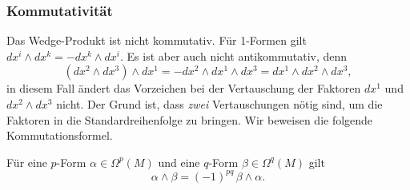 %
%
\subsubsection{Kommutativität}
Das Wedge-Produkt ist nicht kommutativ.
Für 1-Formen gilt $dx^i\wedge dx^k=-dx^k\wedge dx^i$.
Es ist aber auch nicht antikommutativ, denn 
\[
(dx^2\wedge dx^3)\wedge dx^1
=
-dx^2\wedge dx^1\wedge dx^3
=
dx^1\wedge dx^2\wedge dx^3,
\]
in diesem Fall ändert das Vorzeichen bei der Vertauschung der
Faktoren $dx^1$ und $dx^2\wedge dx^3$ nicht.
Der Grund ist, dass {\em zwei} Vertauschungen nötig sind, um
die Faktoren in die Standardreihenfolge zu bringen.
Wir beweisen die folgende Kommutationsformel.

\begin{satz}
Für eine $p$-Form $\alpha\in\Omega^p(M)$ und eine $q$-Form
$\beta\in\Omega^q(M)$ gilt
\begin{equation}
\alpha\wedge\beta
=
(-1)^{pq}\,\beta\wedge\alpha.
\label{buch:pformen:pformen:eqn:kommutativ}
\end{equation}
\end{satz}

